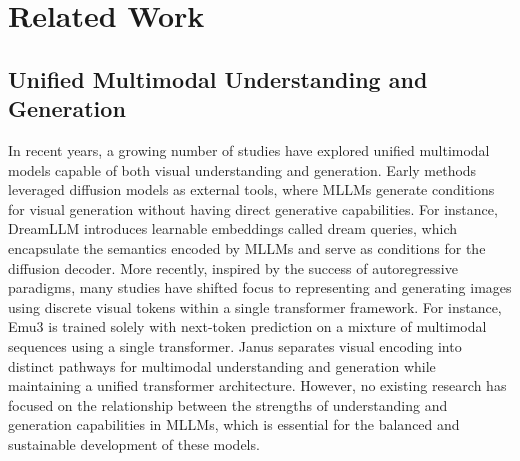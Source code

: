 \section{Related Work}
\subsection{Unified Multimodal Understanding and Generation}
In recent years, a growing number of studies \citep{dong2023dreamllm, ge2024seed, wu2023next, ye2024x, ma2024janusflow, shi2024llamafusion} have explored unified multimodal models capable of both visual understanding and generation. Early methods \citep{dong2023dreamllm, tong2024metamorph, ge2024seed, sun2024generative, zhuang2024towards,zhang2024realcompo} leveraged diffusion models as external tools, where MLLMs generate conditions for visual generation \citep{yang2024mastering,tian2024videotetris} without having direct generative capabilities. For instance, DreamLLM \citep{dong2023dreamllm} introduces learnable embeddings called dream queries, which encapsulate the semantics encoded by MLLMs and serve as conditions for the diffusion decoder. More recently, inspired by the success of autoregressive paradigms, many studies \citep{team2024chameleon, xie2024show, zhou2024transfusion, qu2024tokenflow, xie2024muse, zhang2024fate, wang2024emu3} have shifted focus to representing and generating images using discrete visual tokens within a single transformer framework. For instance, Emu3 \citep{wang2024emu3} is trained solely with next-token prediction on a mixture of multimodal sequences using a single transformer. Janus \citep{wu2024janus} separates visual encoding into distinct pathways for multimodal understanding and generation while maintaining a unified transformer architecture. However, no existing research has focused on the relationship between the strengths of understanding and generation capabilities in MLLMs, which is essential for the balanced and sustainable development of these models.




